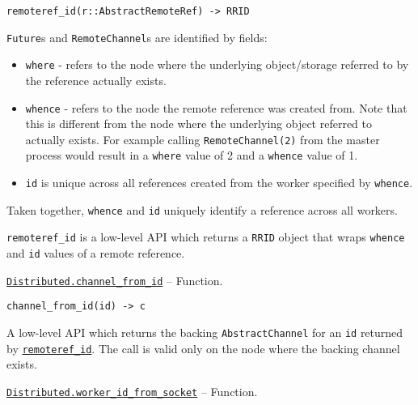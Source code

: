 \begin{adjustwidth}{2em}{0pt}


\begin{verbatim}
remoteref_id(r::AbstractRemoteRef) -> RRID
\end{verbatim}

\texttt{Future}s and \texttt{RemoteChannel}s are identified by fields:

\begin{itemize}
\item \texttt{where} - refers to the node where the underlying object/storage referred to by the reference actually exists.


\item \texttt{whence} - refers to the node the remote reference was created from. Note that this is different from the node where the underlying object referred to actually exists. For example calling \texttt{RemoteChannel(2)} from the master process would result in a \texttt{where} value of 2 and a \texttt{whence} value of 1.


\item \texttt{id} is unique across all references created from the worker specified by \texttt{whence}.

\end{itemize}
Taken together,  \texttt{whence} and \texttt{id} uniquely identify a reference across all workers.

\texttt{remoteref\_id} is a low-level API which returns a \texttt{RRID} object that wraps \texttt{whence} and \texttt{id} values of a remote reference.



\end{adjustwidth}
\hypertarget{5007915834563819885}{} 
\hyperlink{5007915834563819885}{\texttt{Distributed.channel\_from\_id}}  -- {Function.}

\begin{adjustwidth}{2em}{0pt}


\begin{verbatim}
channel_from_id(id) -> c
\end{verbatim}

A low-level API which returns the backing \texttt{AbstractChannel} for an \texttt{id} returned by \hyperlink{10046899291571146856}{\texttt{remoteref\_id}}. The call is valid only on the node where the backing channel exists.



\end{adjustwidth}
\hypertarget{806684110794204081}{} 
\hyperlink{806684110794204081}{\texttt{Distributed.worker\_id\_from\_socket}}  -- {Function.}

